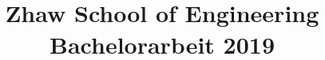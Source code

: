 \title{
  \documenttitle\\[\bigskipamount]
  \large Zhaw School of Engineering\\[\bigskipamount]
  \large Bachelorarbeit 2019
}
\author{\documentauthors}

\maketitle\thispagestyle{empty}
